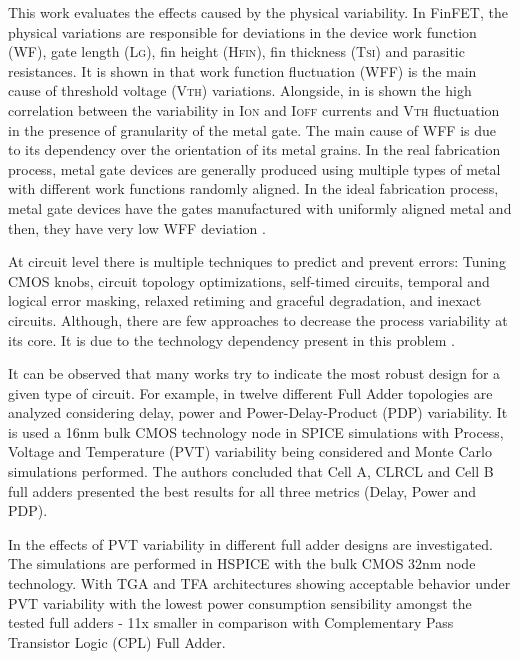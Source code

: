 \documentclass[ecp,tc, english]{iiufrgs}
\begin{document}
This work evaluates the effects caused by the physical variability. In FinFET, the physical variations are responsible for deviations in the device work function (WF), gate length (L\textsc{g}), fin height (H\textsc{fin}), fin thickness (T\textsc{si}) and parasitic resistances. It is shown in \cite{meinhardt2014impact} that work 
function fluctuation (WFF) is the main cause of threshold voltage (V\textsc{th}) variations. Alongside, in \cite{wang2011statistical} is shown the high correlation between the variability in I\textsc{on} and I\textsc{off} currents and V\textsc{th} fluctuation in the presence of granularity of the metal gate. The main cause of WFF is due to its dependency over the orientation of its metal grains. In the real fabrication process, metal gate devices are generally produced using multiple types of metal with different work functions randomly aligned. In the ideal fabrication process, metal gate devices have the gates manufactured with uniformly aligned metal and then, they have very low WFF deviation \cite{zimpeck2016finfet}.

At circuit level there is multiple techniques to predict and prevent errors: Tuning CMOS knobs, circuit topology optimizations, self-timed circuits, temporal and logical error masking, relaxed retiming and graceful degradation, and inexact circuits. Although, there are few approaches to decrease the process variability at its core. It is due to the technology dependency present in this problem \cite{rahimi2016variability}.

It can be observed that many works try to indicate the most robust design for a given type of circuit. For example, in \cite{dokania2013investigation} twelve different Full Adder topologies are analyzed considering delay, power and Power-Delay-Product (PDP) variability. It is used a 16nm bulk CMOS technology node in SPICE simulations with Process, Voltage and Temperature (PVT) variability being considered and Monte Carlo simulations performed. The authors concluded that Cell A, CLRCL and Cell B full adders presented the best results for all three metrics (Delay, Power and PDP).

In \cite{ames2016investigating} the effects of PVT variability in different full adder designs are investigated. The simulations are performed in HSPICE with the bulk CMOS 32nm node technology. With TGA and TFA architectures showing acceptable behavior under PVT variability with the lowest power consumption sensibility amongst the tested full adders - 11x smaller in comparison with Complementary Pass Transistor Logic (CPL) Full Adder.
\end{document}
